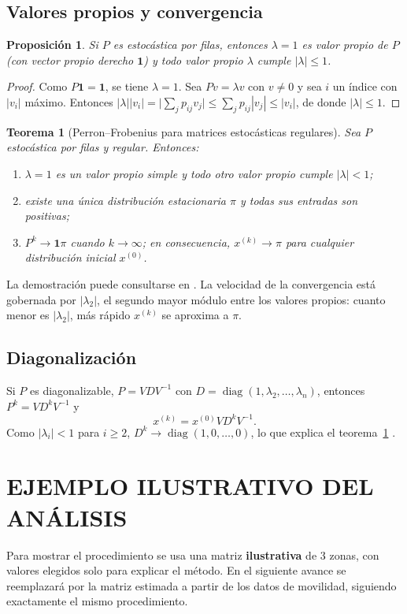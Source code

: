 \documentclass[12pt]{article}
\newtheorem{teorema}{Teorema}[section]
\newtheorem{proposicion}{Proposición}[section]
\begin{document}
\subsection{Valores propios y convergencia}
\begin{proposicion}\label{prop:espectro}
    Si $P$ es estocástica por filas, entonces $\lambda=1$ es valor propio de $P$ (con vector propio
    derecho $\mathbf{1}$) y todo valor propio $\lambda$ cumple $|\lambda|\le 1$.
\end{proposicion}
\begin{proof}
    Como $P\mathbf{1}=\mathbf{1}$, se tiene $\lambda=1$. Sea $Pv=\lambda v$ con $v\ne 0$ y sea $i$
    un índice con $|v_i|$ máximo. Entonces
    $|\lambda||v_i|=\bigl|\sum_j p_{ij}v_j\bigr|\le\sum_j p_{ij}|v_j|\le|v_i|$, de donde
    $|\lambda|\le 1$.
\end{proof}

\begin{teorema}[Perron--Frobenius para matrices estocásticas regulares]\label{teo:pf}
    Sea $P$ estocástica por filas y regular. Entonces:
    \begin{enumerate}
        \item $\lambda=1$ es un valor propio simple y todo otro valor propio cumple $|\lambda|<1$;
        \item existe una única distribución estacionaria $\pi$ y todas sus entradas son positivas;
        \item $P^k\to\mathbf{1}\pi$ cuando $k\to\infty$; en consecuencia, $x^{(k)}\to\pi$ para
              cualquier distribución inicial $x^{(0)}$.
    \end{enumerate}
\end{teorema}
La demostración puede consultarse en \cite{seneta,levin}. La velocidad de la convergencia está
gobernada por $|\lambda_2|$, el segundo mayor módulo entre los valores propios: cuanto menor es
$|\lambda_2|$, más rápido $x^{(k)}$ se aproxima a $\pi$.

\subsection{Diagonalización}
Si $P$ es diagonalizable, $P=VDV^{-1}$ con $D=\operatorname{diag}(1,\lambda_2,\ldots,\lambda_n)$,
entonces $P^k=VD^kV^{-1}$ y
\[
    x^{(k)}=x^{(0)}VD^kV^{-1}.
\]
Como $|\lambda_i|<1$ para $i\ge 2$, $D^k\to\operatorname{diag}(1,0,\ldots,0)$, lo que explica
el teorema~\ref{teo:pf} \cite{meyer,lay}.

\newpage
\section{EJEMPLO ILUSTRATIVO DEL ANÁLISIS}\label{sec:ejemplo}
Para mostrar el procedimiento se usa una matriz \textbf{ilustrativa} de 3 zonas, con valores elegidos solo para explicar el método. En el siguiente avance se reemplazará por la matriz estimada a partir de los datos de movilidad, siguiendo exactamente el mismo procedimiento.
\end{document}
